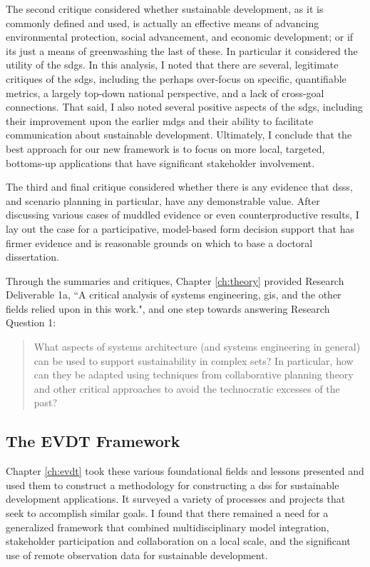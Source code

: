The second critique considered whether sustainable development, as it is commonly defined and used, is actually an effective means of advancing environmental protection, social advancement, and economic development; or if its just a means of greenwashing the last of these. In particular it considered the utility of the \acfp{sdg}. In this analysis, I noted that there are several, legitimate critiques of the \acp{sdg}, including the perhaps over-focus on specific, quantifiable metrics, a largely top-down national perspective, and a lack of cross-goal connections. That said, I also noted several positive aspects of the \acp{sdg}, including their improvement upon the earlier \acfp{mdg} and their ability to facilitate communication about sustainable development. Ultimately, I conclude that the best approach for our new framework is to focus on more local, targeted, bottoms-up applications that have significant stakeholder involvement.

The third and final critique considered whether there is any evidence that \acp{dss}, and scenario planning in particular, have any demonstrable value. After discussing various cases of muddled evidence or even counterproductive results, I lay out the case for a participative, model-based form decision support that has firmer evidence and is reasonable grounds on which to base a doctoral dissertation.

Through the summaries and critiques, Chapter \ref{ch:theory} provided Research Deliverable 1a, ``A critical analysis of systems engineering, \ac{gis}, and the other fields relied upon in this work.", and one step towards answering Research Question 1:

\blockquote{What aspects of systems architecture (and systems engineering in general) can be used to support sustainability in complex \ac{sets}? In particular, how can they be adapted using techniques from collaborative planning theory and other critical approaches to avoid the technocratic excesses of the past?}

\subsection{The EVDT Framework}

Chapter \ref{ch:evdt} took these various foundational fields and lessons presented and used them to construct a methodology for constructing a \ac{dss} for sustainable development applications. It surveyed a variety of processes and projects that seek to accomplish similar goals. I found that there remained a need for a generalized framework that combined multidisciplinary model integration, stakeholder participation and collaboration on a local scale, and the significant use of remote observation data for sustainable development.

